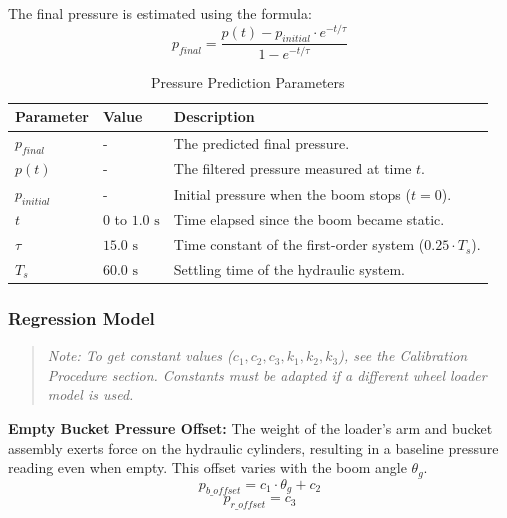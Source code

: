 \documentclass[12pt, a4paper]{article}
\begin{document}
The final pressure is estimated using the formula:
\begin{equation}
    p_{final} = \frac{p(t) - p_{initial} \cdot e^{-t/\tau}}{1 - e^{-t/\tau}}
\end{equation}

\begin{table}[H]
    \centering
    \caption{Pressure Prediction Parameters}
    \begin{tabular}{l|l|l}
        \hline
        \textbf{Parameter} & \textbf{Value} & \textbf{Description} \\
        \hline
        $p_{final}$ & - & The predicted final pressure. \\
        $p(t)$ & - & The filtered pressure measured at time $t$. \\
        $p_{initial}$ & - & Initial pressure when the boom stops ($t=0$). \\
        $t$ & $0$ to $1.0 \text{ s}$ & Time elapsed since the boom became static. \\
        $\tau$ & $15.0 \text{ s}$ & Time constant of the first-order system ($0.25 \cdot T_s$). \\
        $T_s$ & $60.0 \text{ s}$ & Settling time of the hydraulic system. \\
        \hline
    \end{tabular}
\end{table}

\subsubsection{Regression Model}
\begin{quote}
\textit{Note: To get constant values ($c_1, c_2, c_3, k_1, k_2, k_3$), see the Calibration Procedure section. Constants must be adapted if a different wheel loader model is used.}
\end{quote}

\textbf{Empty Bucket Pressure Offset:}
The weight of the loader's arm and bucket assembly exerts force on the hydraulic cylinders, resulting in a baseline pressure reading even when empty. This offset varies with the boom angle $\theta_g$. 
\begin{equation}
    p_{b\_offset} = c_1 \cdot \theta_g + c_2
\end{equation}
\begin{equation}
    p_{r\_offset} = c_3
\end{equation}
\end{document}
